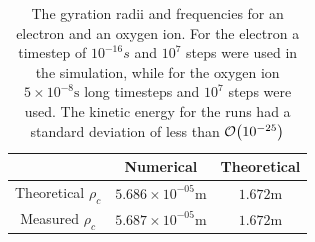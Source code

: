 \documentclass[x11names]{article}
\begin{document}
      \begin{table}
            \centering
            \begin{tabular}{| c | c | c |}
                  \hline
                                          & Numerical   & Theoretical 
                  \\ \hline
                  Theoretical $\rho_c$    &  $5.686 \times 10^{-05} \si{\meter}$   &    $1.672  \si{\meter}$ 
                  \\ \hline
                  Measured $\rho_c$       &  $5.687 \times 10^{-05} \si{\meter}$  &     $1.672 \si{\meter}$ 
            \end{tabular}
            \caption{The gyration radii and frequencies for an electron and an oxygen ion. For the electron a timestep of \( 10^{-16} \si{s} \) and \(10^7\) steps were used in the simulation, while for the oxygen ion \( 5\times 10^{-8} \si{\second } \) long timesteps and \(10^7\) steps were used. The kinetic energy for the runs had a standard deviation of less than \(\order{10^{-25}}\)}
            \label{tab:results}
      \end{table}


\appendix
\end{document}
